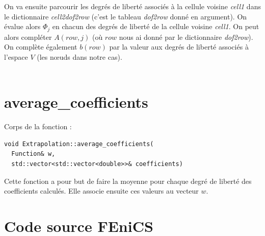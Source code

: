 \documentclass[french]{article}
\begin{document}
	On va ensuite parcourir les degrés de liberté associés à la cellule voisine \textit{cell1} dans le dictionnaire \textit{cell2dof2row} (c'est le tableau \textit{dof2row} donné en argument). On évalue alors $\Phi_j$ en chacun des degrés de liberté de la cellule voisine \textit{cell1}. On peut alors compléter $A(row,j)$ (où $row$ nous ai donné par le dictionnaire \textit{dof2row}). On complète également $b(row)$ par la valeur aux degrés de liberté associés à l'espace $V$ (les nœuds dans notre cas). \\
	
	 \\
	
	\section{average\_coefficients}
	\label{average_coefficients}
	
	Corps de la fonction :
	
	\begin{lstlisting}
void Extrapolation::average_coefficients(
  Function& w,
  std::vector<std::vector<double>>& coefficients)	
	\end{lstlisting}

	Cette fonction a pour but de faire la moyenne pour chaque degré de liberté des coefficients calculés. Elle associe ensuite ces valeurs au vecteur $w$.

	\newpage
	\appendix
	
	\section{Code source FEniCS}
	
	
	
\end{document}
